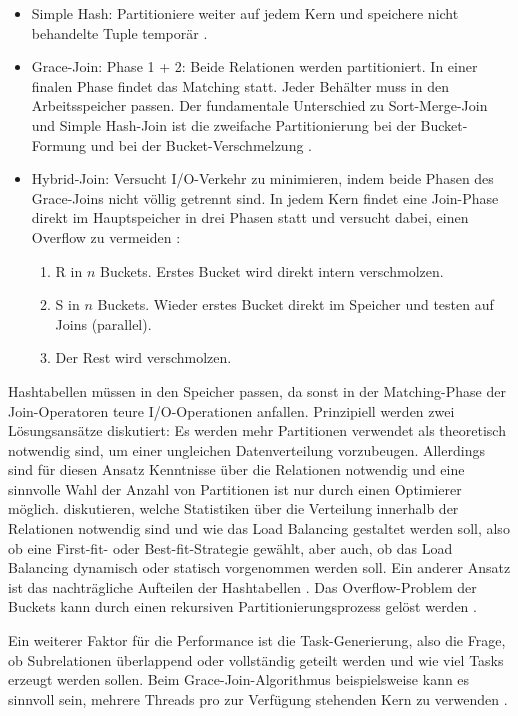 \documentclass[a4paper,12pt,twoside]{article}
\begin{document}
\begin{itemize}
	\item Simple Hash: Partitioniere weiter auf jedem Kern und speichere nicht behandelte Tuple temporär \parencite{Lu1994}.
	\item Grace-Join: Phase 1 + 2: Beide Relationen werden partitioniert. In einer finalen Phase findet das Matching statt. Jeder Behälter muss in den Arbeitsspeicher passen. Der fundamentale Unterschied zu Sort-Merge-Join und Simple Hash-Join ist die zweifache Partitionierung bei der Bucket-Formung und bei der Bucket-Verschmelzung \parencite{Schneider1989}.
	\item Hybrid-Join: Versucht I/O-Verkehr zu minimieren, indem beide Phasen des Grace-Joins nicht völlig getrennt sind. In jedem Kern findet eine Join-Phase direkt im Hauptspeicher in drei Phasen statt und versucht dabei, einen Overflow zu vermeiden \parencite{Schneider1989}:
	\begin{enumerate}
		\item R in $n$ Buckets. Erstes Bucket wird direkt intern verschmolzen.
		\item S in $n$ Buckets. Wieder erstes Bucket direkt im Speicher und testen auf Joins (parallel).
		\item Der Rest wird verschmolzen.
	\end{enumerate}
\end{itemize}

Hashtabellen müssen in den Speicher passen, da sonst in der Matching-Phase der Join-Operatoren teure I/O-Operationen anfallen. Prinzipiell werden zwei Lösungsansätze diskutiert: Es werden mehr Partitionen verwendet als theoretisch notwendig sind, um einer ungleichen Datenverteilung vorzubeugen. Allerdings sind für diesen Ansatz Kenntnisse über die Relationen notwendig und eine sinnvolle Wahl der Anzahl von Partitionen ist nur durch einen Optimierer möglich. {\textcite{Lu1994}} diskutieren, welche Statistiken über die Verteilung innerhalb der Relationen notwendig sind und wie das Load Balancing gestaltet werden soll, also ob eine First-fit- oder Best-fit-Strategie gewählt, aber auch, ob das Load Balancing dynamisch oder statisch vorgenommen werden soll. Ein anderer Ansatz ist das nachträgliche Aufteilen der Hashtabellen \parencite{Mishra1992}. Das Overflow-Problem der Buckets kann durch einen rekursiven Partitionierungsprozess gelöst werden \parencite{DeWitt1985}.

Ein weiterer Faktor für die Performance ist die Task-Generierung, also die Frage, ob Subrelationen überlappend oder vollständig geteilt werden und wie viel Tasks erzeugt werden sollen. Beim Grace-Join-Algorithmus beispielsweise kann es sinnvoll sein, mehrere Threads pro zur Verfügung stehenden Kern zu verwenden \parencite{Lu1994}. 
\end{document}
